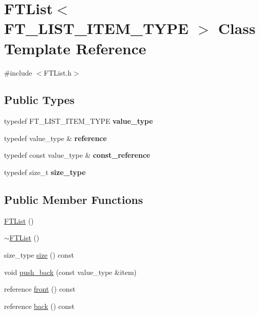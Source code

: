 \hypertarget{class_f_t_list}{\section{F\-T\-List$<$ F\-T\-\_\-\-L\-I\-S\-T\-\_\-\-I\-T\-E\-M\-\_\-\-T\-Y\-P\-E $>$ Class Template Reference}
\label{class_f_t_list}
}


{\ttfamily \#include $<$F\-T\-List.\-h$>$}

\subsection*{Public Types}
\begin{DoxyCompactItemize}
\item 
\hypertarget{class_f_t_list_ae172da3e03bcd6dab4b5f60efe0fc7a3}{typedef F\-T\-\_\-\-L\-I\-S\-T\-\_\-\-I\-T\-E\-M\-\_\-\-T\-Y\-P\-E {\bfseries value\-\_\-type}}\label{class_f_t_list_ae172da3e03bcd6dab4b5f60efe0fc7a3}

\item 
\hypertarget{class_f_t_list_a37fe33040a67a2d5aad9ead2bb2179d7}{typedef value\-\_\-type \& {\bfseries reference}}\label{class_f_t_list_a37fe33040a67a2d5aad9ead2bb2179d7}

\item 
\hypertarget{class_f_t_list_a82677d676935b1f3cb5e9328523bf3a6}{typedef const value\-\_\-type \& {\bfseries const\-\_\-reference}}\label{class_f_t_list_a82677d676935b1f3cb5e9328523bf3a6}

\item 
\hypertarget{class_f_t_list_a5ebe9866c4f86791c6970f19deb09cb1}{typedef size\-\_\-t {\bfseries size\-\_\-type}}\label{class_f_t_list_a5ebe9866c4f86791c6970f19deb09cb1}

\end{DoxyCompactItemize}
\subsection*{Public Member Functions}
\begin{DoxyCompactItemize}
\item 
\hyperlink{class_f_t_list_a4de727811240b9d8568d1d47fd389502}{F\-T\-List} ()
\item 
\hyperlink{class_f_t_list_aabfac3b136119f727611d490aef3eab4}{$\sim$\-F\-T\-List} ()
\item 
size\-\_\-type \hyperlink{class_f_t_list_a73542705ba9556d5cd594c3ec32fe5d2}{size} () const 
\item 
void \hyperlink{class_f_t_list_acd30af5d1a32185842decac3e0c183ce}{push\-\_\-back} (const value\-\_\-type \&item)
\item 
reference \hyperlink{class_f_t_list_a068805ebb222e9ce69a8828b31fd87df}{front} () const 
\item 
reference \hyperlink{class_f_t_list_ae6b5f56991e9d2ac226ce7960e4661f4}{back} () const 
\end{DoxyCompactItemize}


